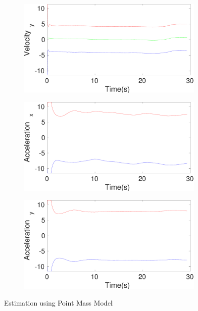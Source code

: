 \begin{figure}[h]
\begin{subfigure}{.5\linewidth}
\end{subfigure}
\begin{subfigure}{.5\linewidth}
\centering
\includegraphics[width=\linewidth]{figures/Frad/s3pmSMVelocity_y}
\end{subfigure}
\begin{subfigure}{.5\linewidth}
\centering
\includegraphics[width=\linewidth]{figures/Frad/s3pmSMAcceleration_x}
\end{subfigure}
\begin{subfigure}{.5\linewidth}
\centering
\includegraphics[width=\linewidth]{figures/Frad/s3pmSMAcceleration_y}
\end{subfigure}
\caption{Estimation using Point Mass Model}
\end{figure}

